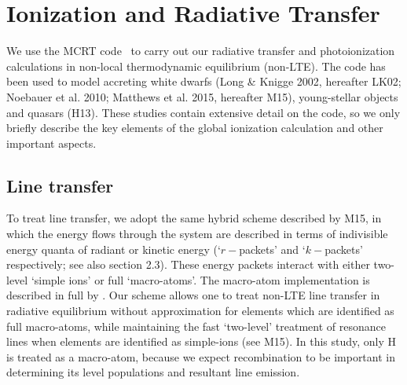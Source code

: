\documentclass[useAMS,usenatbib]{mn2e_x}
\begin{document}










\section{Ionization and Radiative Transfer}

We use the MCRT code \py\ to carry out our radiative transfer and photoionization
calculations in non-local thermodynamic equilibrium (non-LTE). 
The code has been used to model accreting white dwarfs 
(Long \& Knigge 2002, hereafter LK02; Noebauer et al. 2010; 
Matthews et al. 2015, hereafter M15), young-stellar objects \citep{simmacro2005}
and quasars (H13). \nocite{noebauer, M15, LK02}
These studies contain extensive detail on the code, 
so we only briefly describe the key elements of the global 
ionization calculation and other important aspects.

\subsection{Line transfer}

To treat line transfer, we adopt the same hybrid scheme 
described by M15, 
in which the energy flows
through the system are described in terms of indivisible
energy quanta of radiant or kinetic energy 
(`$r-$packets' and `$k-$packets' respectively; see also section 2.3).
These energy packets interact with either two-level `simple ions'
or full `macro-atoms'. The macro-atom implementation 
is described in full by \cite{lucy2002, lucy2003}.
Our scheme allows one to treat non-LTE line transfer in radiative equilibrium
without approximation for elements which are identified as 
full macro-atoms, while maintaining the fast `two-level' 
treatment of resonance lines when elements are identified 
as simple-ions (see M15). In this study,
only H is treated as a macro-atom, because 
we expect recombination to be important
in determining its level populations and resultant line emission.
\end{document}
